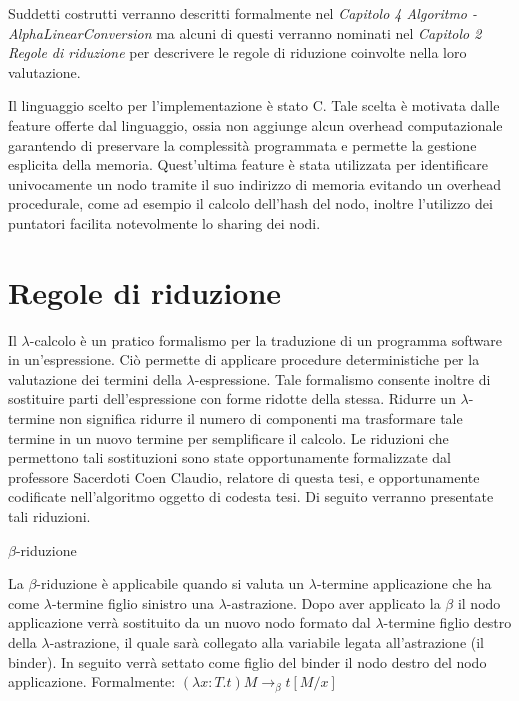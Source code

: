 \documentclass[12pt,a4paper,openright,twoside]{report}
\begin{document}
Suddetti costrutti verranno descritti formalmente nel \textit{Capitolo 4 Algoritmo - AlphaLinearConversion} ma alcuni di questi verranno nominati nel \textit{Capitolo 2 Regole di riduzione} per descrivere le regole di riduzione coinvolte nella loro valutazione.\newline

Il linguaggio scelto per l'implementazione \`e stato C. Tale scelta \`e motivata dalle feature offerte dal linguaggio, ossia non aggiunge alcun overhead computazionale garantendo di preservare la complessit\`a programmata e permette la gestione esplicita della memoria. Quest'ultima feature \`e stata utilizzata per identificare univocamente un nodo tramite il suo indirizzo di memoria evitando un overhead procedurale, come ad esempio il calcolo dell'hash del nodo, inoltre l'utilizzo dei puntatori facilita notevolmente lo sharing dei nodi.\newline



\clearpage{\pagestyle{empty}\cleardoublepage}
\chapter{Regole di riduzione}                %
\lhead[\fancyplain{}{\bfseries\thepage}]{\fancyplain{}{\bfseries\rightmark}}
Il $\lambda$-calcolo \`e un pratico formalismo per la traduzione di un programma software in un'espressione. Ci\`o permette di applicare procedure deterministiche per la valutazione dei termini della $\lambda$-espressione. Tale formalismo consente inoltre di sostituire parti dell'espressione con forme ridotte della stessa. Ridurre un $\lambda$-termine non significa ridurre il numero di componenti ma trasformare tale termine in un nuovo termine per semplificare il calcolo.\newline
Le riduzioni che permettono tali sostituzioni sono state opportunamente formalizzate dal professore Sacerdoti Coen Claudio, relatore di questa tesi, e opportunamente codificate nell'algoritmo oggetto di codesta tesi. Di seguito verranno presentate tali riduzioni.\newline

$\beta$-riduzione

La $\beta$-riduzione \`e applicabile quando si valuta un $\lambda$-termine applicazione che ha come $\lambda$-termine figlio sinistro una $\lambda$-astrazione. Dopo aver applicato la $\beta$ il nodo applicazione verr\`a sostituito da un nuovo nodo formato dal $\lambda$-termine figlio destro della $\lambda$-astrazione, il quale sar\`a collegato alla variabile legata all'astrazione (il binder). In seguito verr\`a settato come figlio del binder il nodo destro del nodo applicazione.\newline
Formalmente: $( \lambda x:T.t)M \rightarrow_\beta t [M/x]$\newline
\end{document}
